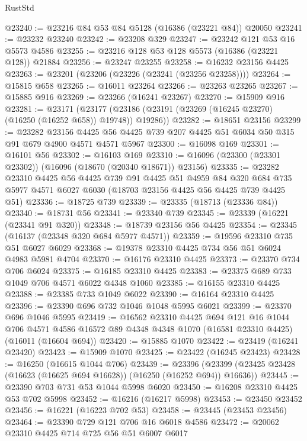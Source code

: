 \begin{lexlean}{RustStd}
\begin{coremodule}
@23240 := @23216 @84 @53 @84 @5128 (@16386 (@23221 @84)) @20050
@23241 := @23232 @23240
@23242 := @23208 @329
@23247 := @23242 @121 @53 @16 @5573 @4586
@23255 := @23216 @128 @53 @128 @5573 (@16386 (@23221 @128)) @21884
@23256 := @23247 @23255
@23258 := @16232 @23156 @4425
@23263 := @23201 (@23206 (@23226 (@23241 (@23256 @23258))))
@23264 := @15815 @658
@23265 := @16011 @23264
@23266 := @23263 @23265
@23267 := @15885 @916
@23269 := @23266 (@16241 @23267)
@23270 := @15909 @916
@23281 := @23171
    (@23177 (@23186 (@23191 (@23269 (@16245 @23270) (@16250 (@16252 @658)) @19748)) @19286))
@23282 := @18651 @23156
@23299 := @23282
    @23156
    @4425
    @56
    @4425
    @739
    @207
    @4425
    @51
    @6034
    @50
    @315
    @91
    @679
    @4900
    @4571
    @4571
    @5967
@23300 := @16098 @169
@23301 := @16101 @56
@23302 := @16103 @169
@23310 := @16096 (@23300 (@23301 @23302)) (@16096 (@18670 (@20340 @18671)) @23156)
@23335 := @23282
    @23310
    @4425
    @56
    @4425
    @739
    @91
    @4425
    @51
    @4959
    @84
    @320
    @684
    @735
    @5977
    @4571
    @6027
    @6030
    (@18703 @23156 @4425 @56 @4425 @739 @4425 @51)
@23336 := @18725 @739
@23339 := @23335 (@18713 (@23336 @84))
@23340 := @18731 @56
@23341 := @23340 @739
@23345 := @23339 (@16221 (@23341 @91 @320))
@23348 := @18739 @23156 @56 @4425
@23354 := @23345 (@16137 (@23348 @320 @684 @5977 @4571))
@23359 := @19596 @23310 @735 @51 @6027 @6029
@23368 := @19378 @23310 @4425 @734 @56 @51 @6024 @4983 @5981 @4704
@23370 := @16176 @23310 @4425
@23373 := @23370 @734 @706 @6024
@23375 := @16185 @23310 @4425
@23383 := @23375 @689 @733 @1049 @706 @4571 @6022 @4348 @1060
@23385 := @16155 @23310 @4425
@23388 := @23385 @733 @1049 @6022
@23390 := @16164 @23310 @4425
@23396 := @23390 @696 @732 @1046 @1048 @5995 @6021
@23399 := @23370 @696 @1046 @5995
@23419 := @16562
    @23310
    @4425
    @694
    @121
    @16
    @1044
    @706
    @4571
    @4586
    @16572
    @89
    @4348
    @4348
    @1070
    (@16581 @23310 @4425)
    (@16011 (@16604 @694))
@23420 := @15885 @1070
@23422 := @23419 (@16241 @23420)
@23423 := @15909 @1070
@23425 := @23422 (@16245 @23423)
@23428 := @16250 (@16615 @1044 @706)
@23439 := @23396
    (@23399 (@23425 @23428 (@16623 (@16625 @694 @16628)) (@16250 (@16252 @694)) @16636))
@23445 := @23390 @703 @731 @53 @1044 @5998 @6020
@23450 := @16208 @23310 @4425 @53 @702 @5998
@23452 := @16216 (@16217 @5998)
@23453 := @23450 @23452
@23456 := @16221 (@16223 @702 @53)
@23458 := @23445 (@23453 @23456)
@23464 := @23390 @729 @121 @706 @16 @6018 @4586
@23472 := @20062 @23310 @4425 @714 @725 @56 @51 @6007 @6017

\end{coremodule}
\end{lexlean}
